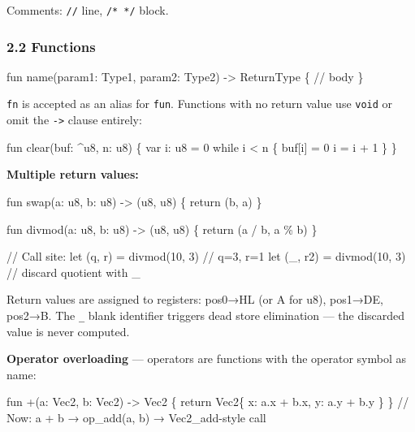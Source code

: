 \documentclass[
  11pt,
  a4paper,
]{report}
\newenvironment{Shaded}{\begin{snugshade}\small}{\end{snugshade}}
\newcommand{\NormalTok}[1]{#1}
\begin{document}
Comments: \texttt{//} line, \texttt{/*\ */} block.

\subsubsection{2.2 Functions}\label{functions}

\begin{Shaded}
\begin{Highlighting}[]
\NormalTok{fun name(param1: Type1, param2: Type2) {-}\textgreater{} ReturnType \{}
\NormalTok{    // body}
\NormalTok{\}}
\end{Highlighting}
\end{Shaded}

\texttt{fn} is accepted as an alias for \texttt{fun}. Functions with no
return value use \texttt{void} or omit the \texttt{-\textgreater{}}
clause entirely:

\begin{Shaded}
\begin{Highlighting}[]
\NormalTok{fun clear(buf: \^{}u8, n: u8) \{}
\NormalTok{    var i: u8 = 0}
\NormalTok{    while i \textless{} n \{}
\NormalTok{        buf[i] = 0}
\NormalTok{        i = i + 1}
\NormalTok{    \}}
\NormalTok{\}}
\end{Highlighting}
\end{Shaded}

\textbf{Multiple return values:}

\begin{Shaded}
\begin{Highlighting}[]
\NormalTok{fun swap(a: u8, b: u8) {-}\textgreater{} (u8, u8) \{}
\NormalTok{    return (b, a)}
\NormalTok{\}}

\NormalTok{fun divmod(a: u8, b: u8) {-}\textgreater{} (u8, u8) \{}
\NormalTok{    return (a / b, a \% b)}
\NormalTok{\}}

\NormalTok{// Call site:}
\NormalTok{let (q, r) = divmod(10, 3)    // q=3, r=1}
\NormalTok{let (\_, r2) = divmod(10, 3)   // discard quotient with \_}
\end{Highlighting}
\end{Shaded}

Return values are assigned to registers: pos0→HL (or A for u8), pos1→DE,
pos2→B. The \texttt{\_} blank identifier triggers dead store elimination
--- the discarded value is never computed.

\textbf{Operator overloading} --- operators are functions with the
operator symbol as name:

\begin{Shaded}
\begin{Highlighting}[]
\NormalTok{fun +(a: Vec2, b: Vec2) {-}\textgreater{} Vec2 \{}
\NormalTok{    return Vec2\{ x: a.x + b.x, y: a.y + b.y \}}
\NormalTok{\}}
\NormalTok{// Now: a + b → op\_add(a, b) → Vec2\_add{-}style call}
\end{Highlighting}
\end{Shaded}
\end{document}
